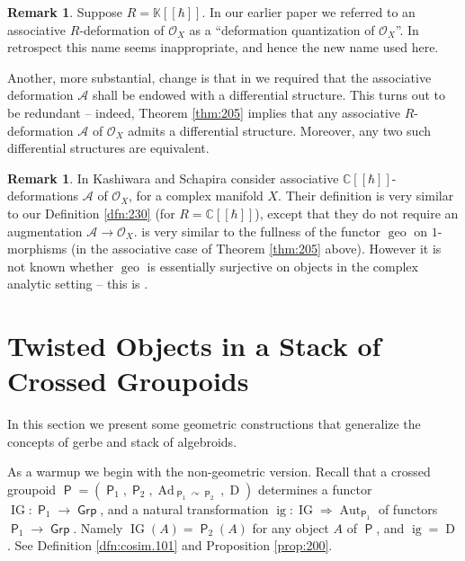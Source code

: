 \documentclass[a4paper, 10pt]{amsart}
\theoremstyle{definition}
\newtheorem{rem}[equation]{Remark}
\numberwithin{equation}{section}
\newcommand{\opn}{\operatorname}
\newcommand{\cat}[1]{\operatorname{\mathsf{#1}}}
\newcommand{\mcal}[1]{\mathcal{#1}}
\newcommand{\mbb}[1]{\mathbb{#1}}
\newcommand{\K}{\mbb{K}}
\newcommand{\OX}{\mcal{O}_X}
\newcommand{\twoto}{\Rightarrow}
\newcommand{\crvar}{\curvearrowright}
\begin{document}
\begin{rem} \label{rem:defs-sh.110}
Suppose $R = \K[[\hbar]]$. In our earlier
paper \cite{Ye1} we referred to an associative $R$-deformation of 
$\mcal{O}_X$ as a ``deformation quantization of $\mcal{O}_X$''. In
retrospect this name seems inappropriate,
and hence the new name used here.

Another, more substantial, change is that in 
\cite[Definition 1.6]{Ye1}
we required that the associative deformation $\mcal{A}$
shall be endowed with a differential structure. This turns out to be
redundant -- indeed, Theorem \ref{thm:205} implies that any
associative $R$-deformation $\mcal{A}$ of $\mcal{O}_X$ admits a differential
structure. Moreover, any two such differential structures are equivalent.
\end{rem}

\begin{rem} \label{rem:221}
In \cite{KS2} Kashiwara and Schapira consider associative
$\mbb{C}[[\hbar]]$-defor\-mations $\mcal{A}$ of $\OX$, for a complex manifold
$X$. Their definition is very similar to our Definition \ref{dfn:230} (for 
$R = \mbb{C}[[\hbar]]$), except that they do not require an augmentation 
$\mcal{A} \to \OX$.
\cite[Proposition 2.2.3]{KS2} is very similar to the fullness of the functor 
$\opn{geo}$ on $1$-morphisms (in the associative case of Theorem \ref{thm:205}
above). However it is not known whether $\opn{geo}$ is essentially surjective
on objects in the complex analytic setting -- this is  \cite[Remark 2.2.7]{KS2}.
\end{rem}

 











\section{Twisted Objects in a Stack of Crossed Groupoids}
\label{sec:tw.sh}

In this section we present some geometric constructions that generalize the
concepts of gerbe and stack of algebroids.

As a warmup we begin with the non-geometric version. 
Recall that a crossed groupoid 
$\cat{P} =
(\cat{P}_1, \cat{P}_2, \opn{Ad}_{\cat{P}_1 \crvar \cat{P}_{2}}, \opn{D})$
determines a functor 
$\opn{IG} : \cat{P}_1 \to \cat{Grp}$,
and a natural transformation 
$\opn{ig} : \opn{IG} \twoto \opn{Aut}_{\cat{P}_1}$
of functors $\cat{P}_1 \to \cat{Grp}$. 
Namely 
$\opn{IG}(A) = \cat{P}_2(A)$ for any object $A$ of $\cat{P}$,
and $\opn{ig} = \opn{D}$. See Definition \ref{dfn:cosim.101} and Proposition
\ref{prop:200}.
\end{document}
